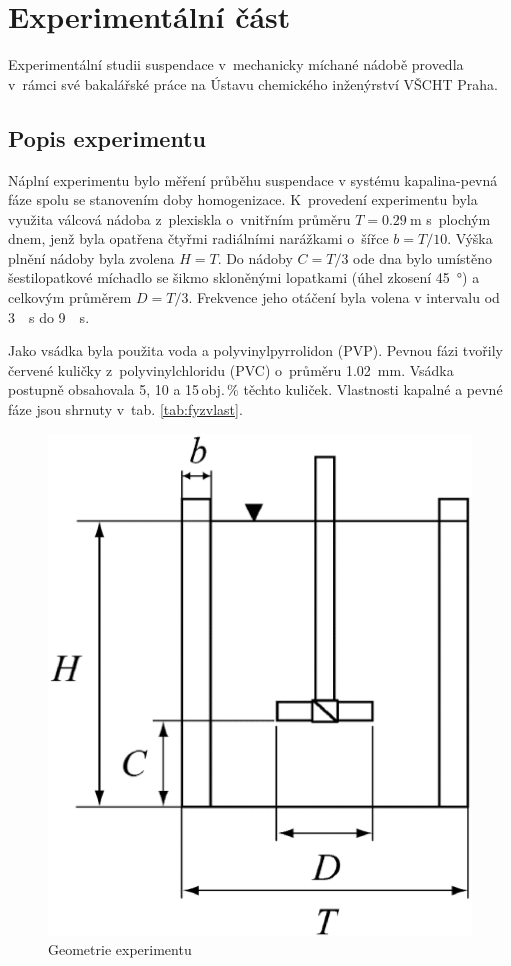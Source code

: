 \chapter{Experimentální část}
Experimentální studii suspendace v~mechanicky míchané nádobě provedla \citet{pav11} v~rámci své bakalářské práce na Ústavu chemického inženýrství VŠCHT Praha.

\section{Popis experimentu}
Náplní experimentu bylo měření průběhu suspendace v systému kapalina-pevná fáze spolu se stanovením doby homogenizace. K~provedení experimentu byla využita válcová nádoba z~plexiskla o~vnitřním průměru $T=\SI{0.29}{\meter}$ s~plochým dnem, jenž byla opatřena čtyřmi radiálními narážkami o~šířce $b=T/10$. Výška plnění nádoby byla zvolena $H=T$. Do nádoby $C=T/3$ ode dna bylo umístěno šestilopatkové míchadlo se šikmo skloněnými lopatkami (úhel zkosení \SI{45}{\degree}) a celkovým průměrem  $D=T/3$. Frekvence jeho otáčení byla volena v intervalu od \SI{3}{\per\second} do \SI{9}{\per\second}.

Jako vsádka byla použita voda a polyvinylpyrrolidon (PVP). Pevnou fázi tvořily červené kuličky z~polyvinylchloridu (PVC) o~průměru \SI{1.02}{\milli\meter}. Vsádka postupně obsahovala 5, 10 a 15\,obj.\,\% těchto kuliček. Vlastnosti kapalné a pevné fáze jsou shrnuty v~tab. \ref{tab:fyzvlast}. 

\begin{figure}[h!]
\centering
\includegraphics[scale=0.44]{images/mujedit.eps}
\caption{Geometrie experimentu}
\label{fig:nadoba}
\end{figure} 

